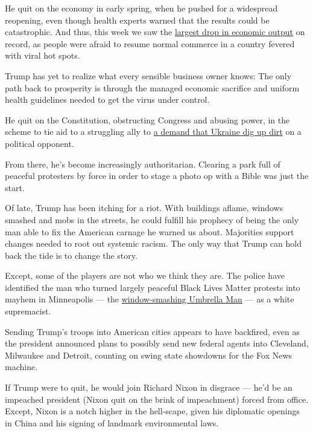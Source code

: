 He quit on the economy in early spring, when he pushed for a widespread
reopening, even though health experts warned that the results could be
catastrophic. And thus, this week we saw the
\href{https://www.nytimes.com/2020/07/30/business/economy/q2-gdp-coronavirus-economy.html}{largest
drop in economic output} on record, as people were afraid to resume
normal commerce in a country fevered with viral hot spots.

Trump has yet to realize what every sensible business owner knows: The
only path back to prosperity is through the managed economic sacrifice
and uniform health guidelines needed to get the virus under control.

He quit on the Constitution, obstructing Congress and abusing power, in
the scheme to tie aid to a struggling ally to
\href{https://www.nytimes.com/2019/11/04/opinion/trump-ukraine.html}{a
demand that Ukraine dig up dirt} on a political opponent.

From there, he's become increasingly authoritarian. Clearing a park full
of peaceful protesters by force in order to stage a photo op with a
Bible was just the start.

Of late, Trump has been itching for a riot. With buildings aflame,
windows smashed and mobs in the streets, he could fulfill his prophecy
of being the only man able to fix the American carnage he warned us
about. Majorities support changes needed to root out systemic racism.
The only way that Trump can hold back the tide is to change the story.

Except, some of the players are not who we think they are. The police
have identified the man who turned largely peaceful Black Lives Matter
protests into mayhem in Minneapolis --- the
\href{https://www.startribune.com/police-umbrella-man-was-a-white-supremacist-trying-to-incite-floyd-rioting/571932272/}{window-smashing
Umbrella Man} --- as a white supremacist.

Sending Trump's troops into American cities appears to have backfired,
even as the president announced plans to possibly send new federal
agents into Cleveland, Milwaukee and Detroit, counting on swing state
showdowns for the Fox News machine.

If Trump were to quit, he would join Richard Nixon in disgrace --- he'd
be an impeached president (Nixon quit on the brink of impeachment)
forced from office. Except, Nixon is a notch higher in the hell-scape,
given his diplomatic openings in China and his signing of landmark
environmental laws.

